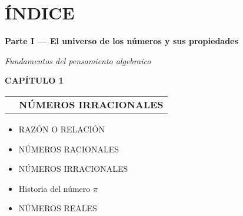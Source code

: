 \chapter*{ÍNDICE}

\newlength{\NumW}     \setlength{\NumW}{0.90cm}   %
\newlength{\SignW}    \setlength{\SignW}{1.20cm}  %
\newlength{\GapSmall} \setlength{\GapSmall}{0.50em} %

\newcommand{\IndiceFila}[3]{%
  \noindent\textbf{CAPÍTULO #1}\par
  \noindent\begin{tabularx}{\textwidth}{@{} >{\raggedleft\arraybackslash}p{\SignW} @{\hspace{\GapSmall}} X @{}}
    {\large\boldmath$#2$} & \textbf{#3}
  \end{tabularx}\par\vspace{-\parskip}
}

\newlength{\BeforeTitle}
\newlength{\SubIndent}\setlength{\SubIndent}{0.6em}
\setlength{\BeforeTitle}{0pt}
\addtolength{\BeforeTitle}{\SignW}
\addtolength{\BeforeTitle}{\GapSmall}
\addtolength{\BeforeTitle}{\SubIndent}
\newcommand{\IndiceSubtitulos}[1]{%
  \noindent\makebox[\BeforeTitle][l]{}%
  \begin{minipage}[t]{\dimexpr\textwidth-\BeforeTitle\relax}
    
    \begin{itemize}[label={}, labelsep=0pt, leftmargin=0pt, itemsep=0.2em, topsep=0.1em]
      #1
    \end{itemize}
  \end{minipage}\par
}

\begin{center}{\Large\bfseries Parte I — El universo de los números y sus propiedades}\end{center}
\begin{center}{\vspace{-0.4em}\Large\itshape Fundamentos del pensamiento algebraico}\end{center}

\IndiceFila{1}{\Large\pi}{NÚMEROS IRRACIONALES}
\IndiceSubtitulos{
  \item RAZÓN O RELACIÓN
  \item NÚMEROS RACIONALES
  \item NÚMEROS IRRACIONALES
  \item Historia del número $\pi$
  \item NÚMEROS REALES
}

